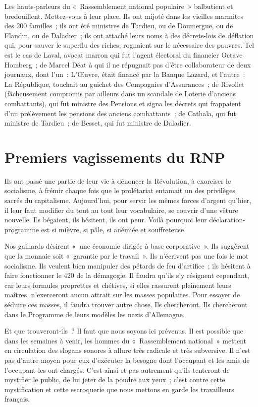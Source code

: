 \documentclass[french,twoside]{book} %
\newcommand\chaptercont{} %
\begin{document}
\chaptercont
\noindent Les hauts-parleurs du « Rassemblement national populaire » balbutient et bredouillent. Mettez-vous à leur place. Ils ont mijoté dans les vieilles marmites des 200 familles ; ils ont été ministres de Tardieu, ou de Doumergue, ou de Flandin, ou de Daladier ; ils ont attaché leurs noms à des décrets-lois de déflation qui, pour sauver le superflu des riches, rognaient sur le nécessaire des pauvres. Tel est le cas de Laval, avocat marron qui fut l’agent électoral du financier Octave Homberg ; de Marcel Déat à qui il ne répugnait pas d’être collaborateur de deux journaux, dont l’un : L’Œuvre, était financé par la Banque Lazard, et l’autre : La République, touchait au guichet des Compagnies d’Assurances ; de Rivollet (fâcheusement compromis par ailleurs dans un scandale de Loterie d’anciens combattants), qui fut ministre des Pensions et signa les décrets qui frappaient d’un prélèvement les pensions des anciens combattants ; de Cathala, qui fut ministre de Tardieu ; de Besset, qui fut ministre de Daladier.\par
\section[Premiers vagissements du RNP]{Premiers vagissements du RNP}
\noindent Ils ont passé une partie de leur vie à dénoncer la Révolution, à exorciser le socialisme, à frémir chaque fois que le prolétariat entamait un des privilèges sacrés du capitalisme. Aujourd’hui, pour servir les mêmes forces d’argent qu’hier, il leur faut modifier du tout au tout leur vocabulaire, se couvrir d’une vêture nouvelle. Ils bégaient, ils hésitent, ils ont peur. Voilà pourquoi leur déclaration-programme est si mièvre, si pâle, si anémiée et souffreteuse.\par
Nos gaillards désirent « une économie dirigée à base corporative ». Ils suggèrent que la monnaie soit « garantie par le travail ». Ils n’écrivent pas une fois le mot socialisme. Ils veulent bien manipuler des pétards de feu d’artifice ; ils hésitent à faire fonctionner le 420 de la démagogie. Il faudra qu’ils s’y résignent cependant, car leurs formules proprettes et chétives, si elles rassurent pleinement leurs maîtres, n’exerceront aucun attrait sur les masses populaires. Pour essayer de séduire ces masses, il faudra trouver autre chose. Ils chercheront. Ils chercheront dans le Programme de leurs modèles les nazis d’Allemagne.\par
Et que trouveront-ils ? Il faut que nous soyons ici prévenus. Il est possible que dans les semaines à venir, les hommes du « Rassemblement national » mettent en circulation des slogans sonores à allure très radicale et très subversive. Il n’est pas d’autre moyen pour eux d’exécuter la besogne dont l’occupant et les amis de l’occupant les ont chargés. C’est ainsi et pas autrement qu’ils tenteront de mystifier le public, de lui jeter de la poudre aux yeux ; c’est contre cette mystification et cette escroquerie que nous mettons en garde les travailleurs français.
\end{document}
